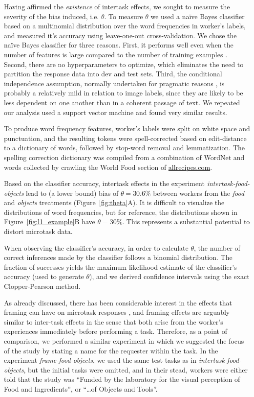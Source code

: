 \documentclass{sigchi}
\begin{document}
Having affirmed the \textit{existence} of intertask effects, we sought to
measure the severity of the bias induced, i.e. $\theta$.
To measure $\theta$ we used a na\"ive Bayes classifier based on a 
multinomial distribution over the word frequencies in worker's labels, 
and measured it's accuracy using leave-one-out cross-validation.  
We chose the na\"ive Bayes
classifier for three reasons.  First, it performs well even when the 
number of features is large compared to the number of training examples
\cite{bickel2004,hastie2009elements}.  
Second, there are no hyperparameters to 
optimize, which eliminates the need to partition the response data into
dev and test sets.
Third, the conditional independence assumption, normally 
undertaken for pragmatic reasons \cite{Zhang2004562}, 
is probably a relatively mild in 
relation to image labels, since they are likely to be less dependent
on one another than in a coherent passage of text.  We repeated our
analysis used a support vector machine and found very similar results.

To produce word frequency features, worker's labels were split on white
space and punctuation, and the resulting tokens were spell-corrected based
on edit-distance to a dictionary of words, followed by stop-word removal
and lemmatization.  The spelling correction
dictionary was compiled from a combination of WordNet 
\cite{felbaum1998wordnet} and words
collected by crawling the World Food section of \url{allrecipes.com}.

Based on the classifier accuracy, intertask effects in the 
experiment \textit{intertask-food-objects}
lead to (a lower bound) bias of $\theta=30.6\%$ between workers from the 
\textit{food} and \textit{objects} treatments (Figure~\ref{fig:theta}A).
It is difficult to visualize the distributions of word frequencies,
but for reference, the distributions shown in 
Figure~\ref{fig:l1_example}B have $\theta = 30\%$.  This represents a 
substantial potential to distort microtask data.

When observing the classifier's accuracy, in order to calculate $\theta$,
the number of correct inferences made by the classifier follows a binomial 
distribution.  The fraction of successes yields the maximum likelihood
estimate of the classifier's accuracy (used to generate $\theta$), 
and we derived confidence intervals using the exact Clopper-Pearson method.

As already discussed, there has been considerable interest in the 
effects that framing can have on microtask responses
\cite{Kinnaird2012281,chandler2013breaking,thibodeau2013natural}, and 
framing effects are arguably similar to inter-task effects in the sense 
that both arise from the worker's experiences immediately before 
performing a task.
Therefore, as a point of comparison, we performed a similar experiment 
in which we suggested the focus of the study by stating a name for
the requester within the task.
In the experiment 
\textit{frame-food-objects}, we used the same test tasks as in 
\textit{intertask-food-objects}, but the initial tasks were omitted, 
and in their stead, workers were either told that the study was 
``Funded by the laboratory for the 
visual perception of Food and Ingredients'', 
or ``\ldots of Objects and Tools''.  
\end{document}
